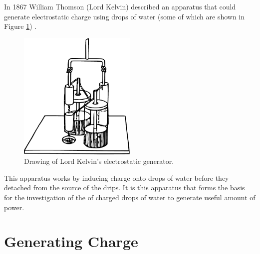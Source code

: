 
In 1867 William Thomson (Lord Kelvin) described an apparatus that
could generate electrostatic charge using drops of water (some of
which are shown in Figure \ref{Figure_Drawing_KelvinWaterDripper_OriginalDevice})
\cite{Thomson1867}.

\begin{figure}
    \centering
    \includegraphics[width=0.5\textwidth]{content/appendices/chargedWaterDrops/graphics/Figure_Drawing_KelvinWaterDripper_OriginalDevice}
    \caption{Drawing of Lord Kelvin's electrostatic generator.}
    \label{Figure_Drawing_KelvinWaterDripper_OriginalDevice}
\end{figure}

This apparatus works by inducing charge onto drops of water before
they detached from the source of the drips. It is this apparatus that
forms the basis for the investigation of the of charged drops of water
to generate useful amount of power.


\section{Generating Charge}

